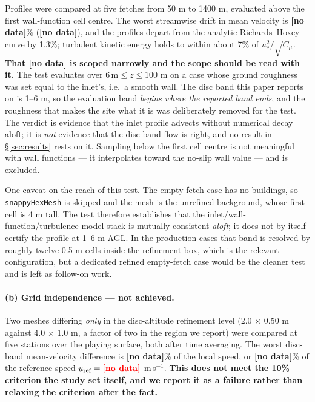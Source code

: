 \documentclass[11pt,letterpaper]{article}
\newcommand{\MISSINGNUM}{\textbf{\color{red}[no data]}}%
\newcommand{\ABLdrift}{\MISSINGNUM}\newcommand{\ABLverdict}{\MISSINGNUM}%
\newcommand{\GridDiff}{\MISSINGNUM}\newcommand{\GridDiffUref}{\MISSINGNUM}%
\begin{document}
Profiles were compared at five fetches from 50 m to 1400 m, evaluated above the
first wall-function cell centre. The worst streamwise drift in mean velocity is
\ABLdrift\% (\ABLverdict), and the profiles depart from the analytic
Richards--Hoxey curve by 1.3\%; turbulent kinetic energy holds to within about
7\% of $u_*^2/\sqrt{C_\mu}$.
\textbf{That \ABLverdict{} is scoped narrowly and the scope should be read with it.} The
test evaluates over $6\,\text{m} \le z \le 100$ m on a case whose ground roughness was set
equal to the inlet's, i.e.\ a smooth wall. The disc band this paper reports on is 1--6 m,
so the evaluation band \emph{begins where the reported band ends}, and the roughness that
makes the site what it is was deliberately removed for the test. The verdict is evidence
that the inlet profile advects without numerical decay aloft; it is \emph{not} evidence
that the disc-band flow is right, and no result in \S\ref{sec:results} rests on it. Sampling below the first cell centre is not
meaningful with wall functions --- it interpolates toward the no-slip wall
value --- and is excluded.

One caveat on the reach of this test. The empty-fetch case has no buildings, so
\texttt{snappyHexMesh} is skipped and the mesh is the unrefined background,
whose first cell is 4 m tall. The test therefore establishes that the
inlet/wall-function/turbulence-model stack is mutually consistent \emph{aloft};
it does not by itself certify the profile at 1--6 m AGL. In the production cases
that band is resolved by roughly twelve 0.5 m cells inside the refinement box,
which is the relevant configuration, but a dedicated refined empty-fetch case
would be the cleaner test and is left as follow-on work.

\paragraph{(b) Grid independence --- \textbf{not achieved}.} Two meshes
differing \emph{only} in the disc-altitude refinement level (2.0 $\times$ 0.50 m
against 4.0 $\times$ 1.0 m, a factor of two in the region we report) were
compared at five stations over the playing surface, both after time averaging.
The worst disc-band mean-velocity difference is \GridDiff\% of the local
speed, or \GridDiffUref\% of the reference speed
$u_{\text{ref}} = \Uref$ m\,s$^{-1}$. \textbf{This does not meet the 10\%
criterion the study set itself, and we report it as a failure rather than
relaxing the criterion after the fact.}
\end{document}
